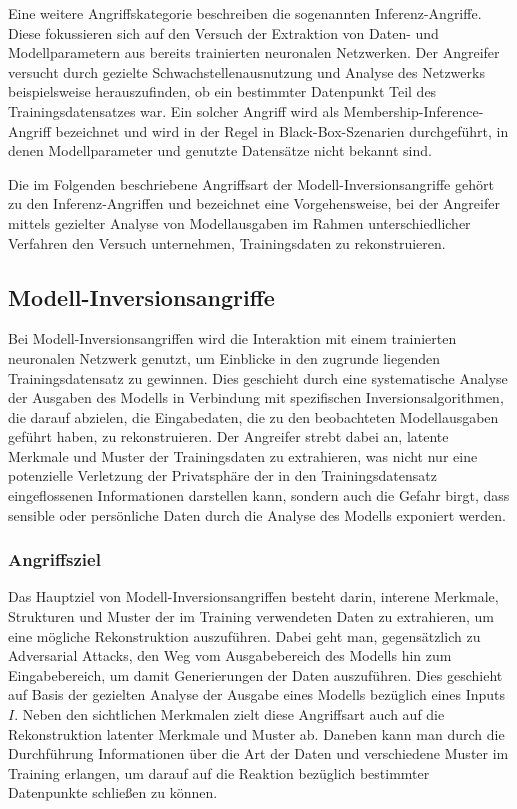 Eine weitere Angriffskategorie beschreiben die sogenannten Inferenz-Angriffe. Diese fokussieren sich auf den Versuch der Extraktion von Daten- und Modellparametern aus bereits trainierten neuronalen Netzwerken. Der Angreifer versucht durch gezielte Schwachstellenausnutzung und Analyse des Netzwerks beispielsweise herauszufinden, ob ein bestimmter Datenpunkt Teil des Trainingsdatensatzes war. Ein solcher Angriff wird als \glqq Membership-Inference-Angriff\grqq{} bezeichnet und wird in der Regel in Black-Box-Szenarien durchgeführt, in denen Modellparameter und genutzte Datensätze nicht bekannt sind. 

Die im Folgenden beschriebene Angriffsart der \glqq Modell-Inversionsangriffe\grqq{} gehört zu den Inferenz-Angriffen und bezeichnet eine Vorgehensweise, bei der Angreifer mittels gezielter Analyse von Modellausgaben im Rahmen unterschiedlicher Verfahren den Versuch unternehmen, Trainingsdaten zu rekonstruieren.

\subsection{Modell-Inversionsangriffe}
Bei Modell-Inversionsangriffen wird die Interaktion mit einem trainierten neuronalen Netzwerk genutzt, um Einblicke in den zugrunde liegenden Trainingsdatensatz zu gewinnen. Dies geschieht durch eine systematische Analyse der Ausgaben des Modells in Verbindung mit spezifischen Inversionsalgorithmen, die darauf abzielen, die Eingabedaten, die zu den beobachteten Modellausgaben geführt haben, zu rekonstruieren. Der Angreifer strebt dabei an, latente Merkmale und Muster der Trainingsdaten zu extrahieren, was nicht nur eine potenzielle Verletzung der Privatsphäre der in den Trainingsdatensatz eingeflossenen Informationen darstellen kann, sondern auch die Gefahr birgt, dass sensible oder persönliche Daten durch die Analyse des Modells exponiert werden.
\subsubsection{Angriffsziel}
Das Hauptziel von Modell-Inversionsangriffen besteht darin, interene Merkmale, Strukturen und Muster der im Training verwendeten Daten zu extrahieren, um eine mögliche Rekonstruktion auszuführen. Dabei geht man, gegensätzlich zu \glqq Adversarial Attacks\grqq{}, den Weg vom Ausgabebereich des Modells hin zum Eingabebereich, um damit Generierungen der Daten auszuführen. Dies geschieht auf Basis der gezielten Analyse der Ausgabe eines Modells bezüglich eines Inputs $I$. Neben den sichtlichen Merkmalen zielt diese Angriffsart auch auf die Rekonstruktion latenter Merkmale und Muster ab. Daneben kann man durch die Durchführung Informationen über die Art der Daten und verschiedene Muster im Training erlangen, um darauf auf die Reaktion bezüglich bestimmter Datenpunkte schließen zu können.

